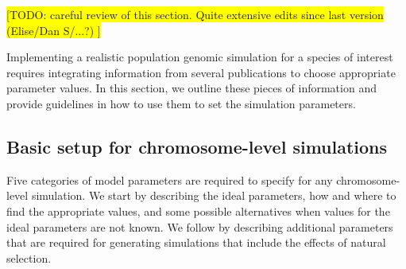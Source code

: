 \documentclass[hidelinks]{article}
\begin{document}
\colorbox{yellow}{[TODO: careful review of this section. Quite extensive edits since last version (Elise/Dan S/...?) ]}\vspace{1em}


Implementing a realistic population genomic simulation for a species of interest
requires integrating information from several publications to choose appropriate parameter values. 
In this section, we outline these pieces of information and
provide guidelines in how to use them to set the simulation parameters.



\subsection*{Basic setup for chromosome-level simulations}

Five categories of model parameters are required to specify for any chromosome-level simulation.
We start by describing the ideal parameters, how and where to find the appropriate values, and some possible
alternatives when values for the ideal parameters are not known. We follow by describing
additional parameters that are required for generating simulations that include 
the effects of natural selection.
\end{document}
